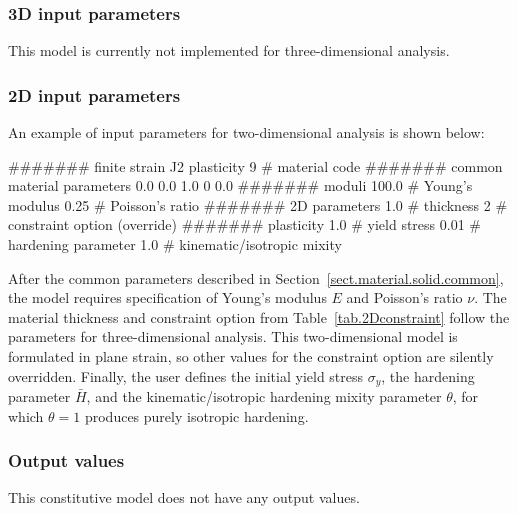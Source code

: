 \subsubsection{3D input parameters}
This model is currently not implemented for three-dimensional analysis.

\subsubsection{2D input parameters}
An example of input parameters for two-dimensional analysis is shown 
below:
\begin{inputfile}
####### finite strain J2 plasticity
9     # material code
####### common material parameters
0.0    0.0    1.0
0      0.0
####### moduli
100.0 # Young's modulus
0.25  # Poisson's ratio
####### 2D parameters
1.0   # thickness
2     # constraint option (override)
####### plasticity
1.0   # yield stress
0.01  # hardening parameter
1.0   # kinematic/isotropic mixity
\end{inputfile}
After the common parameters described in 
Section~\ref{sect.material.solid.common}, the 
model requires specification of Young's modulus 
$E$ and Poisson's ratio $\nu$. 
The material thickness and 
constraint option from Table~\ref{tab.2Dconstraint} 
follow the parameters for three-dimensional analysis.
This two-dimensional model is formulated in plane strain,
so other values for the constraint option are silently
overridden.
Finally, the user defines the initial 
yield stress $\sigma_{y}$, the hardening parameter $\bar{H}$, and the 
kinematic/isotropic hardening mixity parameter $\theta$, 
for which $\theta = 1$ produces purely isotropic hardening.

\subsubsection{Output values}
This constitutive model does not have any output values.

